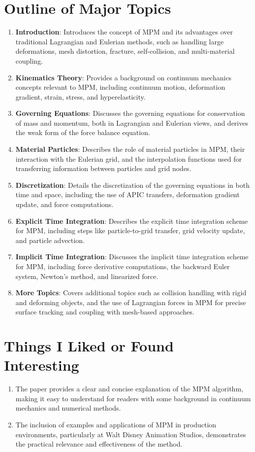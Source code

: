 \documentclass[12pt]{article}
\begin{document}
\section{Outline of Major Topics}
\begin{enumerate}[noitemsep]
    \item \textbf{Introduction}: Introduces the concept of MPM and its advantages over traditional Lagrangian and Eulerian methods, such as handling large deformations, mesh distortion, fracture, self-collision, and multi-material coupling.
    \item \textbf{Kinematics Theory}: Provides a background on continuum mechanics concepts relevant to MPM, including continuum motion, deformation gradient, strain, stress, and hyperelasticity.
    \item \textbf{Governing Equations}: Discusses the governing equations for conservation of mass and momentum, both in Lagrangian and Eulerian views, and derives the weak form of the force balance equation.
    \item \textbf{Material Particles}: Describes the role of material particles in MPM, their interaction with the Eulerian grid, and the interpolation functions used for transferring information between particles and grid nodes.
    \item \textbf{Discretization}: Details the discretization of the governing equations in both time and space, including the use of APIC transfers, deformation gradient update, and force computations.
    \item \textbf{Explicit Time Integration}: Describes the explicit time integration scheme for MPM, including steps like particle-to-grid transfer, grid velocity update, and particle advection.
    \item \textbf{Implicit Time Integration}: Discusses the implicit time integration scheme for MPM, including force derivative computations, the backward Euler system, Newton's method, and linearized force.
    \item \textbf{More Topics}: Covers additional topics such as collision handling with rigid and deforming objects, and the use of Lagrangian forces in MPM for precise surface tracking and coupling with mesh-based approaches.
\end{enumerate}

\section{Things I Liked or Found Interesting}
\begin{enumerate}[noitemsep]
    \item The paper provides a clear and concise explanation of the MPM algorithm, making it easy to understand for readers with some background in continuum mechanics and numerical methods.
    \item The inclusion of examples and applications of MPM in production environments, particularly at Walt Disney Animation Studios, demonstrates the practical relevance and effectiveness of the method.
\end{enumerate}
\end{document}

